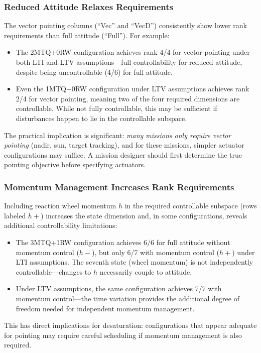 \documentclass[conference]{IEEEtran}
\begin{document}
\subsubsection{Reduced Attitude Relaxes Requirements}
The vector pointing columns (``Vec'' and ``VecD'') consistently show lower rank requirements than full attitude (``Full''). For example:
\begin{itemize}
    \item The 2MTQ+0RW configuration achieves rank 4/4 for vector pointing under both LTI and LTV assumptions---full controllability for reduced attitude, despite being uncontrollable (4/6) for full attitude.
    \item Even the 1MTQ+0RW configuration under LTV assumptions achieves rank 2/4 for vector pointing, meaning two of the four required dimensions are controllable. While not fully controllable, this may be sufficient if disturbances happen to lie in the controllable subspace.
\end{itemize}
The practical implication is significant: \emph{many missions only require vector pointing} (nadir, sun, target tracking), and for these missions, simpler actuator configurations may suffice. A mission designer should first determine the true pointing objective before specifying actuators.

\subsubsection{Momentum Management Increases Rank Requirements}
Including reaction wheel momentum $h$ in the required controllable subspace (rows labeled $h+$) increases the state dimension and, in some configurations, reveals additional controllability limitations:
\begin{itemize}
    \item The 3MTQ+1RW configuration achieves 6/6 for full attitude without momentum control ($h-$), but only 6/7 with momentum control ($h+$) under LTI assumptions. The seventh state (wheel momentum) is not independently controllable---changes to $h$ necessarily couple to attitude.
    \item Under LTV assumptions, the same configuration achieves 7/7 with momentum control---the time variation provides the additional degree of freedom needed for independent momentum management.
\end{itemize}
This has direct implications for desaturation: configurations that appear adequate for pointing may require careful scheduling if momentum management is also required.
\end{document}
